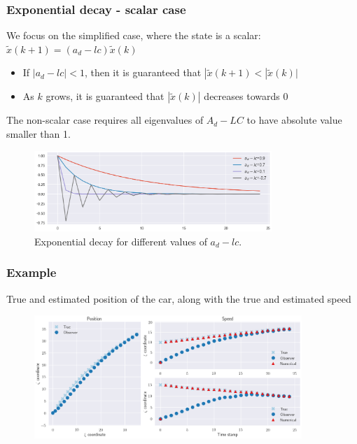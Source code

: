 \begin{frame}
	\frametitle{Exponential decay - scalar case}
	We focus on the simplified case, where the state is a scalar: $\tilde{x}(k+1)= (a_d-lc)\tilde{x}(k)$
	
	\begin{itemize}
		\item If $|a_d-lc|<1$, then it is guaranteed that $|\tilde{x}(k+1)< |\tilde{x}(k)|$
		\item As $k$ grows, it is guaranteed that $|\tilde{x}(k)|$ decreases towards 0
	\end{itemize}

	The non-scalar case requires all eigenvalues of $A_d-LC$ to have absolute value smaller than 1.
	
	\begin{figure}[b]
		\includegraphics[width=0.8\textwidth]{fig/exponential_decay}
		\caption*{Exponential decay for different values of $a_d-lc$.}
	\end{figure}
	
	
	
\end{frame}

\begin{frame}
    \frametitle{Example}
    True and estimated position of the car, along with the true and estimated speed
    \begin{figure}
    	\includegraphics[width=0.9\textwidth]{fig/observer_ex_1}
    \end{figure}
\end{frame}

